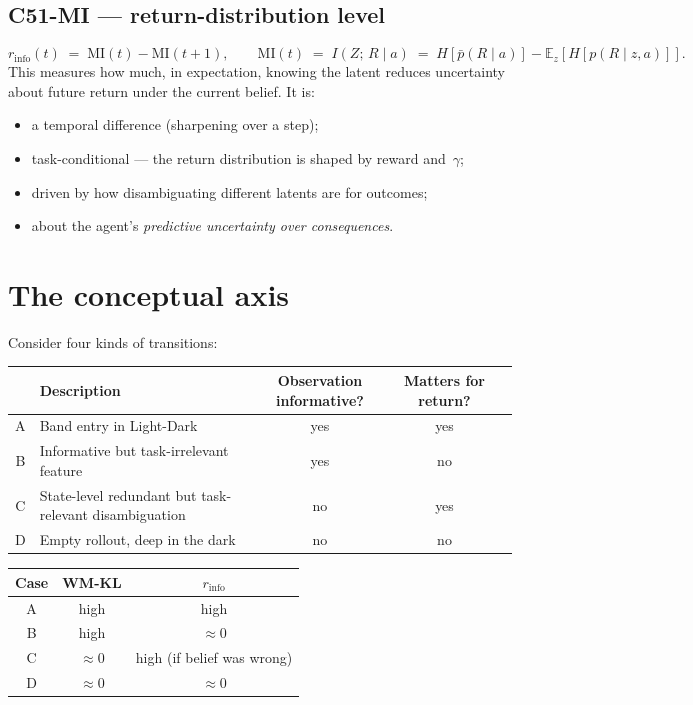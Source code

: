 \documentclass[11pt]{article}
\begin{document}
\subsection*{C51-MI --- return-distribution level}
\[
  r_{\mathrm{info}}(t)
  \;=\;
  \mathrm{MI}(t) - \mathrm{MI}(t{+}1),
  \qquad
  \mathrm{MI}(t) \;=\; I\!\left(Z;\, R \mid a\right)
  \;=\;
  H\!\left[\bar{p}(R\mid a)\right]
  - \mathbb{E}_z\!\left[ H\!\left[p(R\mid z, a)\right] \right].
\]
This measures how much, in expectation, knowing the latent reduces
uncertainty about future return under the current belief. It is:
\begin{itemize}
  \item a temporal difference (sharpening over a step);
  \item task-conditional --- the return distribution is shaped by reward and~$\gamma$;
  \item driven by how disambiguating different latents are for outcomes;
  \item about the agent's \emph{predictive uncertainty over consequences}.
\end{itemize}

\section{The conceptual axis}

Consider four kinds of transitions:

\begin{center}
\begin{tabular}{clccc}
\toprule
 & Description & Observation informative? & Matters for return? \\
\midrule
A & Band entry in Light-Dark        & yes & yes \\
B & Informative but task-irrelevant feature & yes & no  \\
C & State-level redundant but task-relevant disambiguation & no  & yes \\
D & Empty rollout, deep in the dark & no  & no  \\
\bottomrule
\end{tabular}
\end{center}

\begin{center}
\begin{tabular}{ccc}
\toprule
Case & WM-KL & $r_{\mathrm{info}}$ \\
\midrule
A & high & high \\
B & high & $\approx 0$ \\
C & $\approx 0$ & high (if belief was wrong) \\
D & $\approx 0$ & $\approx 0$ \\
\bottomrule
\end{tabular}
\end{center}
\end{document}
